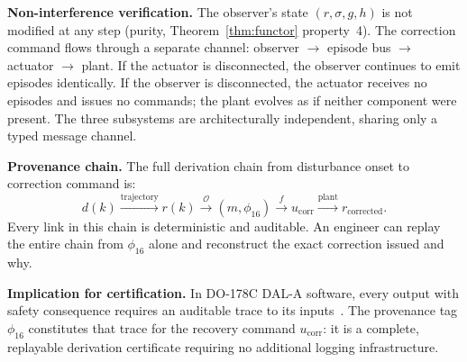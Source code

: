 \documentclass[11pt,a4paper]{article}
\theoremstyle{plain}
\theoremstyle{definition}
\theoremstyle{remark}
\newcommand{\Obs}{\mathcal{O}}
\begin{document}
\textbf{Non-interference verification.} The observer's state $(r, \sigma, g, h)$ is not
modified at any step (purity, Theorem~\ref{thm:functor} property~4). The correction command
flows through a separate channel: observer $\to$ episode bus $\to$ actuator $\to$ plant. If
the actuator is disconnected, the observer continues to emit episodes identically. If the
observer is disconnected, the actuator receives no episodes and issues no commands; the plant
evolves as if neither component were present. The three subsystems are architecturally
independent, sharing only a typed message channel.

\textbf{Provenance chain.} The full derivation chain from disturbance onset to correction
command is:
\[
  d(k) \xrightarrow{\text{trajectory}} r(k)
  \xrightarrow{\Obs} (m, \phi_{16})
  \xrightarrow{f} u_{\text{corr}}
  \xrightarrow{\text{plant}} r_{\text{corrected}}.
\]
Every link in this chain is deterministic and auditable. An engineer can replay the entire
chain from $\phi_{16}$ alone and reconstruct the exact correction issued and why.

\textbf{Implication for certification.} In DO-178C DAL-A software, every output with safety
consequence requires an auditable trace to its inputs~\cite{do178c}. The provenance tag
$\phi_{16}$ constitutes that trace for the recovery command $u_{\text{corr}}$: it is a
complete, replayable derivation certificate requiring no additional logging infrastructure.
\end{document}
